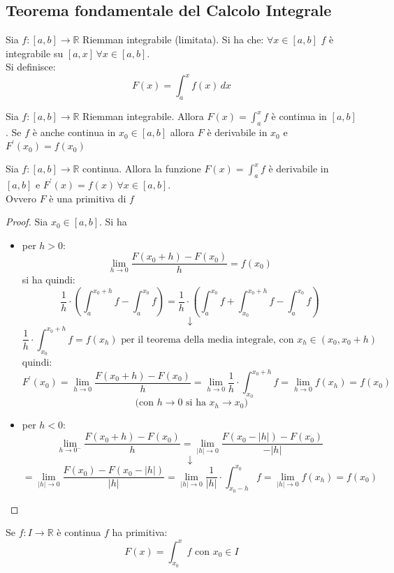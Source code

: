 \documentclass[a4paper,12pt, oneside]{book}
\begin{document}
\subsection{Teorema fondamentale del Calcolo Integrale}
\begin{teorema}
	Sia $f:[a,b]\rightarrow\mathbb{R}$ Riemman integrabile (limitata). Si ha che:
	$\forall x\in[a,b]$ $f$ è integrabile su $[a,x]\,\forall x\in[a,b]$.\\Si definisce:$$F(x)=\int_a^x f(x)\,dx$$
\end{teorema}
\begin{teorema}
	Sia $f:[a,b]\rightarrow\mathbb{R}$ Riemman integrabile. Allora $F(x)=\int_a^x f$ è continua in $[a,b]$. Se $f$ è anche continua in $x_0\in[a,b]$ allora $F$ è derivabile in $x_0$ e $F^{'}(x_0)=f(x_0)$
\end{teorema}
\begin{teorema}
	Sia $f:[a,b]\rightarrow\mathbb{R}$ continua. Allora la funzione $F(x)=\int_a^x f$ è derivabile in $[a,b]$ e $F^{'}(x)=f(x)\,\forall x\in[a,b]$.\\Ovvero $F$ è una primitiva di $f$
\end{teorema}
\begin{proof}
	Sia $x_0\in[a,b]$. Si ha
	\begin{itemize}
		\item per $h>0$:
		      $$\lim_{h\rightarrow 0}\frac{F(x_0+h)-F(x_0)}{h}=f(x_0)$$
		      si ha quindi:
		      $$\frac{1}{h}\cdot \left( \int_a^{x_0+h} f-\int_a^{x_0} f\right)=\frac{1}{h}\cdot \left( \int_a^{x_0}f+\int_{x_0}^{x_0+h}f-\int_a^{x_0} f \right)$$
		      $$\downarrow$$
		      $$\frac{1}{h}\cdot\int_{x_0}^{x_0+h}f=f(x_h)\mbox{ per il teorema della media integrale, con }x_h\in(x_0,x_0+h)$$
		      quindi:
		      $$F^{'}(x_0)=\lim_{h\rightarrow 0}\frac{F(x_0+h)-F(x_0)}{h}=\lim_{h\rightarrow 0}\frac{1}{h}\cdot\int_{x_0}^{x_0+h}f=\lim_{h\rightarrow 0} f(x_h)=f(x_0)$$
		      $$ \mbox{ (con } h\rightarrow 0 \mbox{ si ha }x_h\rightarrow x_0)$$
		\item per $h<0$:
		      $$\lim_{h\rightarrow 0^{-}}\frac{F(x_0+h)-F(x_0)}{h}=\lim_{|h|\rightarrow 0}\frac{F(x_0-|h|)-F(x_0)}{-|h|}$$
		      $$\downarrow$$
		      $$=\lim_{|h|\rightarrow 0}\frac{F(x_0)-F(x_0-|h|)}{|h|}=\lim_{|h|\rightarrow 0}\frac{1}{|h|}\cdot\int_{x_0-h}^{x_0}f=\lim_{|h|\rightarrow 0}f(x_h)=f(x_0)$$
	\end{itemize}
\end{proof}
\begin{corollario}
	Se $f:I\rightarrow\mathbb{R}$ è continua $f$ ha primitiva:
	$$F(x)=\int_{x_0}^x f\mbox{ con } x_0\in I$$
\end{corollario}
\end{document}
